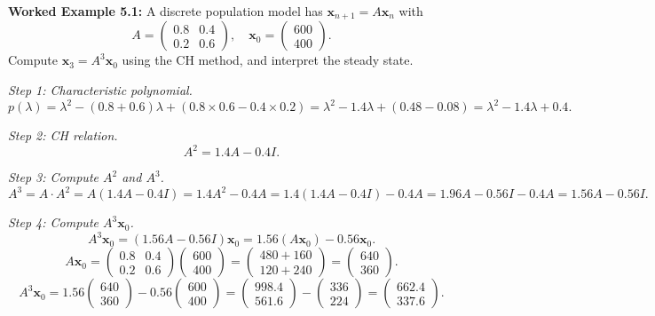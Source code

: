 \documentclass[12pt,a4paper]{article}
\begin{document}
\textbf{Worked Example 5.1:} A discrete population model has \(\mathbf{x}_{n+1} = A\mathbf{x}_n\) with
\[
  A = \begin{pmatrix} 0.8 & 0.4 \\ 0.2 & 0.6 \end{pmatrix}, \quad \mathbf{x}_0 = \begin{pmatrix}600 \\ 400\end{pmatrix}.
\]
Compute \(\mathbf{x}_3 = A^3\mathbf{x}_0\) using the CH method, and interpret the steady state.

\textit{Step 1: Characteristic polynomial.}
\[
  p(\lambda) = \lambda^2 - (0.8+0.6)\lambda + (0.8 \times 0.6 - 0.4 \times 0.2) = \lambda^2 - 1.4\lambda + (0.48 - 0.08) = \lambda^2 - 1.4\lambda + 0.4.
\]

\textit{Step 2: CH relation.}
\[
  A^2 = 1.4A - 0.4I.
\]

\textit{Step 3: Compute \(A^2\) and \(A^3\).}
\[
  A^3 = A \cdot A^2 = A(1.4A - 0.4I) = 1.4A^2 - 0.4A = 1.4(1.4A-0.4I) - 0.4A = 1.96A - 0.56I - 0.4A = 1.56A - 0.56I.
\]

\textit{Step 4: Compute \(A^3\mathbf{x}_0\).}
\[
  A^3\mathbf{x}_0 = (1.56A - 0.56I)\mathbf{x}_0 = 1.56(A\mathbf{x}_0) - 0.56\mathbf{x}_0.
\]
\[
  A\mathbf{x}_0 = \begin{pmatrix}0.8&0.4\\0.2&0.6\end{pmatrix}\begin{pmatrix}600\\400\end{pmatrix}
  = \begin{pmatrix}480+160\\120+240\end{pmatrix} = \begin{pmatrix}640\\360\end{pmatrix}.
\]
\[
  A^3\mathbf{x}_0 = 1.56\begin{pmatrix}640\\360\end{pmatrix} - 0.56\begin{pmatrix}600\\400\end{pmatrix}
  = \begin{pmatrix}998.4\\561.6\end{pmatrix} - \begin{pmatrix}336\\224\end{pmatrix}
  = \begin{pmatrix}662.4\\337.6\end{pmatrix}.
\]
\end{document}
